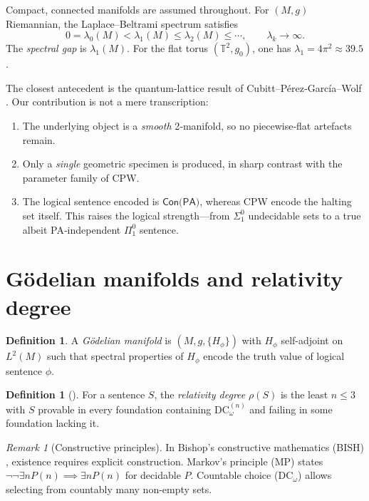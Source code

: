 \documentclass[11pt]{article}
\theoremstyle{definition}\newtheorem{definition}[theorem]{Definition}
\theoremstyle{remark}\newtheorem{remark}[theorem]{Remark}
\newcommand{\DCw}{\mathrm{DC}_{\omega}}
\begin{document}
Compact, connected manifolds are assumed throughout. For $(M,g)$ Riemannian, the Laplace–Beltrami spectrum satisfies
\[
0=\lambda_0(M)<\lambda_1(M)\le\lambda_2(M)\le\cdots,\qquad
\lambda_k\to\infty.
\]
The \emph{spectral gap} is $\lambda_1(M)$. For the flat torus $(\mathbb{T}^2, g_0)$, one has $\lambda_1 = 4\pi^2 \approx 39.5$.

The closest antecedent is the quantum‑lattice result of
Cubitt–Pérez‑García–Wolf \cite{Cubitt2015}.  Our contribution is not a
mere transcription:
\begin{enumerate}[label=\textnormal{(\roman*)}]
  \item The underlying object is a \emph{smooth} 2‑manifold, so no
        piecewise‑flat artefacts remain.
  \item Only a \emph{single} geometric specimen is produced, in sharp
        contrast with the parameter family of CPW.
  \item  The logical sentence encoded is
        $\textsf{Con(PA)}$, whereas CPW encode the halting set itself.
        This raises the logical strength—from $\Sigma^0_1$ undecidable
        sets to a true albeit PA‑independent $\Pi^0_1$ sentence.
\end{enumerate}

\section{Gödelian manifolds and relativity degree}

\begin{definition}
A \emph{Gödelian manifold} is $(M,g,\{H_\phi\})$ with $H_\phi$ self-adjoint on $L^2(M)$ such that spectral properties of $H_\phi$ encode the truth value of logical sentence $\phi$.
\end{definition}

\begin{definition}[\cite{Lee2025Framework}]
For a sentence $S$, the \emph{relativity degree} $\rho(S)$ is the least $n\le3$ with $S$ provable in every foundation containing $\DCw^{(n)}$ and failing in some foundation lacking it.
\end{definition}

\begin{remark}[Constructive principles]
In Bishop's constructive mathematics (BISH) \cite{BishopBridges1985}, existence requires explicit construction. Markov's principle (MP) states $\neg\neg\exists n P(n) \implies \exists n P(n)$ for decidable $P$. Countable choice ($\DCw$) allows selecting from countably many non-empty sets.
\end{remark}
\end{document}
